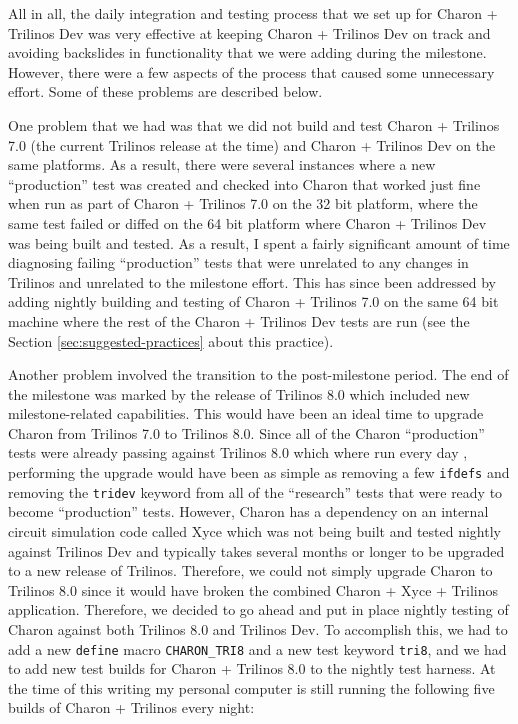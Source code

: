 \documentclass[pdf,ps2pdf,11pt]{SANDreport}
\begin{document}
All in all, the daily integration and testing process that we set up for Charon
+ Trilinos Dev was very effective at keeping Charon + Trilinos Dev on track
and avoiding backslides in functionality that we were adding during the
milestone.  However, there were a few aspects of the process that caused some
unnecessary effort.  Some of these problems are described below.

One problem that we had was that we did not build and test Charon + Trilinos
7.0 (the current Trilinos release at the time) and Charon + Trilinos Dev on
the same platforms.  As a result, there were several instances where a new
``production'' test was created and checked into Charon that worked just fine
when run as part of Charon + Trilinos 7.0 on the 32 bit platform, where the
same test failed or diffed on the 64 bit platform where Charon + Trilinos Dev
was being built and tested.  As a result, I spent a fairly significant amount
of time diagnosing failing ``production'' tests that were unrelated to any
changes in Trilinos and unrelated to the milestone effort.  This has since
been addressed by adding nightly building and testing of Charon + Trilinos 7.0
on the same 64 bit machine where the rest of the Charon + Trilinos Dev tests
are run (see the Section {}\ref{sec:suggested-practices} about this practice).

Another problem involved the transition to the post-milestone period.  The end
of the milestone was marked by the release of Trilinos 8.0 which included new
milestone-related capabilities.  This would have been an ideal time to upgrade
Charon from Trilinos 7.0 to Trilinos 8.0.  Since all of the Charon
``production'' tests were already passing against Trilinos 8.0 which where run
every day , performing the upgrade would have been as simple as removing a few
{}\texttt{ifdefs} and removing the {}\texttt{tridev} keyword from all of the
``research'' tests that were ready to become ``production'' tests.  However,
Charon has a dependency on an internal circuit simulation code called Xyce
which was not being built and tested nightly against Trilinos Dev and
typically takes several months or longer to be upgraded to a new release of
Trilinos.  Therefore, we could not simply upgrade Charon to Trilinos 8.0 since
it would have broken the combined Charon + Xyce + Trilinos application.
Therefore, we decided to go ahead and put in place nightly testing of Charon
against both Trilinos 8.0 and Trilinos Dev.  To accomplish this, we had to add
a new {}\texttt{define} macro {}\texttt{CHARON\_TRI8} and a new test keyword
{}\texttt{tri8}, and we had to add new test builds for Charon + Trilinos 8.0
to the nightly test harness.  At the time of this writing my personal computer
is still running the following five builds of Charon + Trilinos every night:
\end{document}
